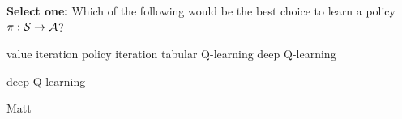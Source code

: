 \begin{parts}
\begin{subparts}


\subpart[1] \textbf{Select one:} Which of the following would be the best choice to learn a policy $\pi : \mathcal{S} \rightarrow \mathcal{A}$?
    \begin{checkboxes}
     \choice value iteration
     \choice policy iteration
     \choice tabular Q-learning
     \choice deep Q-learning
    \end{checkboxes}
    \begin{soln}
    deep Q-learning
    \end{soln}
    \begin{qauthor}   Matt    \end{qauthor}

    
\end{subparts}


\end{parts}